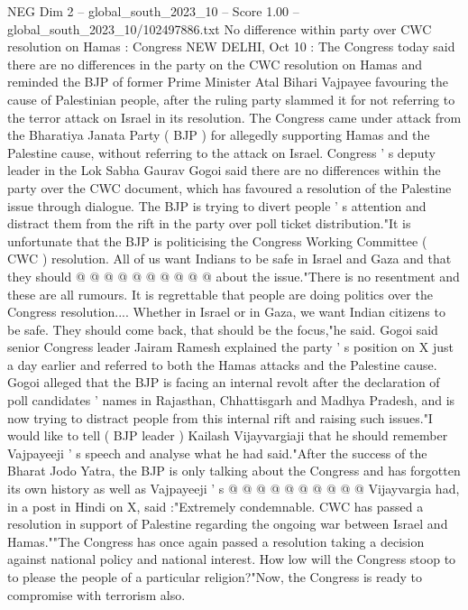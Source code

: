 \begin{textsample}{NEG Dim 2 – global\_south\_2023\_10 – Score 1.00 – global\_south\_2023\_10/102497886.txt}  \label{ex:f2_neg_271}
No difference within party over CWC resolution on Hamas : Congress NEW DELHI, Oct 10 : The Congress today said there are no differences in the party on the CWC resolution on Hamas and reminded the BJP of former Prime Minister Atal Bihari Vajpayee favouring the cause of Palestinian people, after the ruling party slammed it for not referring to the terror attack on Israel in its resolution.
The Congress came under attack from the Bharatiya Janata Party ( BJP ) for allegedly supporting Hamas and the Palestine cause, without referring to the attack on Israel.
Congress ' s deputy leader in the Lok Sabha Gaurav Gogoi said there are no differences within the party over the CWC document, which has favoured a resolution of the Palestine issue through dialogue.
The BJP is trying to divert people ' s attention and distract them from the rift in the party over poll ticket distribution."It is unfortunate that the BJP is politicising the Congress Working Committee ( CWC ) resolution.
All of us want Indians to be safe in Israel and Gaza and that they should @ @ @ @ @ @ @ @ @ @ about the issue."There is no resentment and these are all rumours.
It is regrettable that people are doing politics over the Congress resolution....
Whether in Israel or in Gaza, we want Indian citizens to be safe.
They should come back, that should be the focus,"he said.
Gogoi said senior Congress leader Jairam Ramesh explained the party ' s position on X just a day earlier and referred to both the Hamas attacks and the Palestine cause.
Gogoi alleged that the BJP is facing an internal revolt after the declaration of poll candidates ' names in Rajasthan, Chhattisgarh and Madhya Pradesh, and is now trying to distract people from this internal rift and raising such issues."I would like to tell ( BJP leader ) Kailash Vijayvargiaji that he should remember Vajpayeeji ' s speech and analyse what he had said."After the success of the Bharat Jodo Yatra, the BJP is only talking about the Congress and has forgotten its own history as well as Vajpayeeji ' s @ @ @ @ @ @ @ @ @ @ Vijayvargia had, in a post in Hindi on X, said :"Extremely condemnable.
CWC has passed a resolution in support of Palestine regarding the ongoing war between Israel and Hamas.""The Congress has once again passed a resolution taking a decision against national policy and national interest.
How low will the Congress stoop to to please the people of a particular religion?"Now, the Congress is ready to compromise with terrorism also.

\end{textsample}
